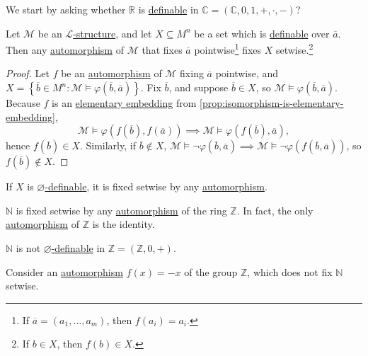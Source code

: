 We start by asking whether \(\mathbb{R} \) is \hyperref[def:definable]{definable} in \(\mathbb{C} = (\mathbb{C} , 0, 1, +, \cdot, -)\)?

\begin{proposition}
	Let \(\mathcal{M} \) be an \hyperref[def:structure]{\(\mathcal{L} \)-structure}, and let \(X \subseteq M^n\) be a set which is \hyperref[def:definable]{definable} over \(\overline{a} \). Then any \hyperref[def:automorphism]{automorphism} of \(\mathcal{M} \) that fixes \(\overline{a} \) pointwise\footnote{If \(\overline{a} =(a_1, \ldots , a_m)\), then \(f(a_i) = a_i\).} fixes \(X\) setwise.\footnote{If \(b\in X\), then \(f(b)\in X\).}
\end{proposition}
\begin{proof}
	Let \(f\) be an \hyperref[def:automorphism]{automorphism} of \(\mathcal{M} \) fixing \(\overline{a} \) pointwise, and \(X = \left\{ \overline{b} \in M^n\colon \mathcal{M} \models \varphi (\overline{b}, \overline{a} ) \right\} \). Fix \(\overline{b} \), and suppose \(\overline{b} \in X\), so \(\mathcal{M} \models \varphi (\overline{b} , \overline{a} )\). Because \(f\) is an \hyperref[def:elementary-embedding]{elementary embedding} from \autoref{prop:isomorphism-is-elementary-embedding},
	\[
		\mathcal{M} \models \varphi (f(\overline{b} ), f(\overline{a} ))
		\implies \mathcal{M} \models \varphi (f(\overline{b} ), \overline{a} ),
	\]
	hence \(f(\overline{b} )\in X\). Similarly, if \(\overline{b} \notin X\), \(\mathcal{M} \models \lnot \varphi (\overline{b} , \overline{a} ) \implies \mathcal{M} \models \lnot \varphi (f(\overline{b} , \overline{a} ))\), so \(f(\overline{b} ) \notin X\).
\end{proof}

\begin{remark}
	If \(X\) is \hyperref[def:definable]{\(\varnothing \)-definable}, it is fixed setwise by any \hyperref[def:automorphism]{automorphism}.
\end{remark}

\begin{eg}
	\(\mathbb{N} \) is fixed setwise by any \hyperref[def:automorphism]{automorphism} of the ring \(\mathbb{Z} \). In fact, the only \hyperref[def:automorphism]{automorphism} of \(\mathbb{Z} \) is the identity.
\end{eg}

\begin{eg}
	\(\mathbb{N} \) is not \hyperref[def:definable]{\(\varnothing \)-definable} in \(\mathbb{Z} =(\mathbb{Z} , 0, +)\).
\end{eg}
\begin{explanation}
	Consider an \hyperref[def:automorphism]{automorphism} \(f(x) = -x\) of the group \(\mathbb{Z} \), which does not fix \(\mathbb{N} \) setwise.
\end{explanation}

